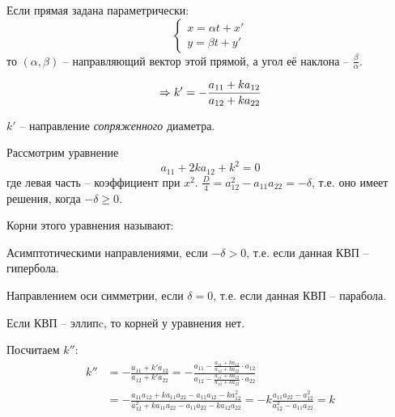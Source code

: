 \begin{Rem}
	Если прямая задана параметрически:
	\[\begin{cases}
		x = \alpha t + x' \\
		y = \beta t + y'
	\end{cases}\]
	то $(\alpha, \beta)$ -- направляющий вектор этой прямой, а угол её наклона -- $\frac{\beta}{\alpha}$.
\end{Rem}

\begin{equation}\label{eq:diameter_angle}
	\Rightarrow k' = - \frac{a_{11} + ka_{12}}{a_{12} + ka_{22}}
\end{equation}

\begin{Def}
	$k'$ -- направление \textit{сопряженного} диаметра.
\end{Def}

\begin{Rem}
	Рассмотрим уравнение 
	\[a_{11} + 2ka_{12} + k^2 = 0\]
	где левая часть -- коэффициент при $x^2$. $\frac{D}{4} = a_{12}^2 - a_{11} a_{22} = -\delta$, т.е. 
	оно имеет решения, когда $-\delta \geqslant 0$.

	Корни этого уравнения называют:
	\begin{MyItemize}
		\item Асимптотическими направлениями, если $-\delta > 0$, т.е. если данная КВП -- гипербола.
		\item Направлением оси симметрии, если $\delta = 0$, т.е. если данная КВП -- парабола.
		\item Если КВП -- эллипc, то корней у уравнения нет.
	\end{MyItemize}
\end{Rem}

\begin{Rem}
	Посчитаем $k''$:
	\begin{align*}
		k'' &=  - \frac{a_{11} + k'a_{12}}{a_{12} + k'a_{22}} = - \frac{a_{11} - \frac{a_{11} + ka_{12}}{a_{12} + k a_{22}} \cdot a_{12}}{a_{12} - \frac{a_{11} + ka_{12}}{a_{12} + ka_{22}}\cdot a_{22}} \\
		&= - \frac{a_{11} a_{12} + ka_{11} a_{22} - a_{11} a_{12} - ka_{12}^2}{a_{12}^2 + ka_{11} a_{22} - a_{11} a_{22} -ka_{12} a_{22}} = -k \frac{a_{11} a_{22} - a_{12}^2}{a_{12}^2 - a_{11} a_{22} } = k \\
	\end{align*}
\end{Rem}

